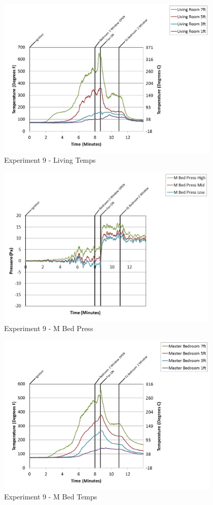 \documentclass{article}
\begin{document}
\begin{appendices}
\begin{figure}[h!]
	\centering
	\includegraphics[height=3.05in]{0_Images/Results_Charts/Exp_9_Charts/LivingTemps.png}
	\caption{Experiment 9 - Living Temps}
\end{figure}

\clearpage

\begin{figure}[h!]
	\centering
	\includegraphics[height=3.05in]{0_Images/Results_Charts/Exp_9_Charts/MBedPress.png}
	\caption{Experiment 9 - M Bed Press}
\end{figure}


\begin{figure}[h!]
	\centering
	\includegraphics[height=3.05in]{0_Images/Results_Charts/Exp_9_Charts/MBedTemps.png}
	\caption{Experiment 9 - M Bed Temps}
\end{figure}


\end{appendices}
\end{document}
